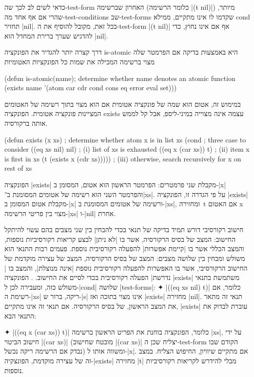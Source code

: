 כדאי לשים לב לכך שה-test-form האחרון שברשימה (כלומר הרשימה \T|(t nil)|) מיותר,
שהרי אם אף אחד מה-test-conditions שב-test-forms שקדמו לו אינו מתקיים, ממילא
cond תחזיר \E|nil|. בכל זאת, מקובל להוסיף את ה-test-form \T|(t nil)| אף אם אינו
נחוץ, כדי להדגיש שערך ברירת המחדל הוא \E|nil|.

דרך קצרה יותר להגדיר את הפונקציה is-atomic היא באמצעות בדיקה אם הפרמטר
שלה מצוי ברשימה המכילה את שמות כל הפונקציות האטומיות
\begin{KERNEL}
(defun is-atomic(name); determine whether name denotes an atomic function
  (exists name '(atom car cdr cond cons eq error eval set)))
\end{KERNEL}
במימוש זה, אטום הוא שמה של פונקציה אטומית אם הוא מצוי בתוך רשימה של האטומים
המציינות פונקציה אטומית. הפונקציה exists עצמה אינה מצוייה במיני-ליספ, אבל
קל לממש אותה ברקורסיה.
\begin{LISP}
(defun exists (x xs) ; determine whether atom x is in list xs
  (cond ; three case to consider
    ((eq xs nil) nil) ; (i) list of xs is exhausted
    ((eq x (car xs)) t) ; (ii) item x is first in xs
    (t (exists x (cdr xs))))) ; (iii) otherwise, search recursively for x on rest of xs
\end{LISP}
הפונקציה \T|exists| מקבלת שני פרמטרים: הפרמטר הראשון הוא אטום, המסומן ב-\T|x|
והפרמטר השני הוא רשימה של אטומים המסומנת ב־\T|xs|. על פי הגדרה זו, הפונקציה
\T|exists| מקבלת אטום המסומן ב-\T|x| ורשימה של אטומים המסומנת ב-\T|xs|,
ומחזירה~t אם האטום x מצוי בין פריטי הרשימה-\T|xs| ו-\T|nil| אחרת.

חישוב רקורסיבי דורש תמיד בדיקה של תנאי בכדי להבחין בין שני מצבים בהם עשוי
להיתקל החישוב: המצב של בסיס הרקורסיה, אשר בו \ע|לא ניתן| לבצע קריאות רקורסיביות
נוספות, והמצב הכללי אשר בו \ע|קיימת אפשרות| להפעלה רקורסיבית נוספת. פעמים רבות
התנאי הוא משולש ומבחין בין שלושה מצבים: המצב של בסיס הרקורסיה, המצב של עצירה
מוקדמת של החישוב הרקורסיבי, אשר בו האפשרות להפעלה רקורסיבית נוספת \ע|אינה מנוצלת|,
והמצב בו \ע|נדרשת| הפעלה רקורסיבית בכדי לסיים את החישוב.
.
הפונקציה \T|exists| משתמשת בתנאי משולש כזה, ומעבירה לכן ל-\T|cond| שלושה
\E|test-forms|:
✦ \T|((eq xs nil) t)| כלומר, אם רשימת ה-\T|xs| ריקה, ברור ש-\T|s| אינו מצוי
בתוכה ואז \T|exists| מחזירה \T|nil|. תנאי זה מתאר את המצב הראשון, של בסיס
הרקורסיה. אם תנאי זה אינו מתקיים, \T|exists| עוברת לבדוק את התנאי הבא:

✦ \T|((eq x (car xs)) t)| כלומר, הפונקציה בוחנת את הפריט הראשון ברשימה \T|xs|,
על ידי חישוב הביטוי \T|(car xs)| (מובטח שחישוב \T|(car xs)| יצליח שכן
ה-test-form הקודם שבו נבדק אם הרשימה ריקה נכשל) ומשווה אותו ל-\T|x|. אם מתקיים
שיוויון, החיפוש הצליח. במצב זה של עצירה מוקדמת, הפונצקיה-\T|exists|
מחזירה \T|t| מבלי להידרש לקריאות רקורסיביות נוספות.

